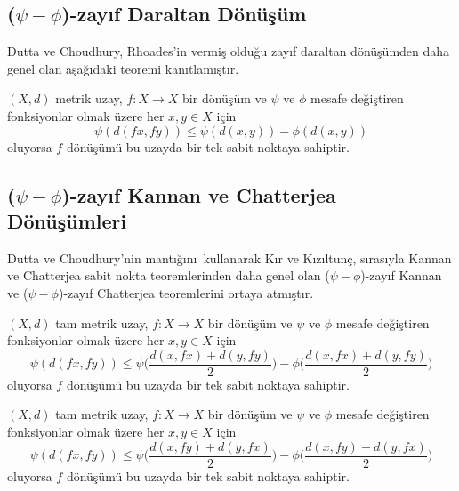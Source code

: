 \documentclass[8pt]{beamer}
\begin{document}
\subsection{($\psi-\phi$)-zay\i f Daraltan D\"{o}n\"{u}\c{s}\"{u}m}
\begin{frame}
Dutta ve Choudhury\cite{Dutta2008}, Rhoades\cite{Rhoades2001}'in vermi\c{s} oldu\u{g}u zay\i f daraltan d\"{o}n\"{u}\c{s}\"{u}mden daha genel olan a\c{s}a\u{g}\i daki teoremi kan\i tlam\i \c{s}t\i r.
  \begin{theorem}
     $(X,d)$ metrik uzay, $f: X \rightarrow X$ bir d\"{o}n\"{u}\c{s}\"{u}m ve $\psi$ ve $\phi$ mesafe de\u{g}i\c{s}tiren fonksiyonlar olmak \"uzere her $x, y\in X$ i\c{c}in
     \begin{equation*}
       \psi(d(fx,fy))\leq \psi(d(x,y))-\phi(d(x,y))
     \end{equation*}
oluyorsa $f$ d\"{o}n\"{u}\c{s}\"{u}m\"{u} bu uzayda bir tek sabit noktaya sahiptir.
  \end{theorem}
\end{frame}


\subsection{($\psi-\phi$)-zay\i f Kannan ve Chatterjea D\"{o}n\"{u}\c{s}\"{u}mleri}
\begin{frame}
Dutta ve Choudhury\cite{Dutta2008}'nin mant\i \u{g}\i n\i \ kullanarak K\i r ve K\i z\i ltun\c{c}\cite{Kir2013}, s\i ras\i yla Kannan ve Chatterjea sabit nokta teoremlerinden daha genel olan ($\psi-\phi$)-zay\i f Kannan ve ($\psi-\phi$)-zay\i f Chatterjea teoremlerini ortaya atm\i \c{s}t\i r.
  \begin{theorem}
     $(X,d)$ tam metrik uzay, $f: X \rightarrow X$ bir d\"{o}n\"{u}\c{s}\"{u}m ve $\psi$ ve $\phi$ mesafe de\u{g}i\c{s}tiren fonksiyonlar olmak \"uzere her $x, y\in X$ i\c{c}in
     \begin{equation*}
       \psi(d(fx,fy))\leq \psi\bigg(\frac{d(x,fx)+d(y,fy)}{2}\bigg)-\phi\bigg(\frac{d(x,fx)+d(y,fy)}{2}\bigg)
     \end{equation*}
oluyorsa $f$ d\"{o}n\"{u}\c{s}\"{u}m\"{u} bu uzayda bir tek sabit noktaya sahiptir.
  \end{theorem}
  \begin{theorem}
     $(X,d)$ tam metrik uzay, $f: X \rightarrow X$ bir d\"{o}n\"{u}\c{s}\"{u}m ve $\psi$ ve $\phi$ mesafe de\u{g}i\c{s}tiren fonksiyonlar olmak \"uzere her $x, y\in X$ i\c{c}in
     \begin{equation*}
       \psi(d(fx,fy))\leq \psi\bigg(\frac{d(x,fy)+d(y,fx)}{2}\bigg)-\phi\bigg(\frac{d(x,fy)+d(y,fx)}{2}\bigg)
     \end{equation*}
oluyorsa $f$ d\"{o}n\"{u}\c{s}\"{u}m\"{u} bu uzayda bir tek sabit noktaya sahiptir.
  \end{theorem}
\end{frame}
\end{document}
